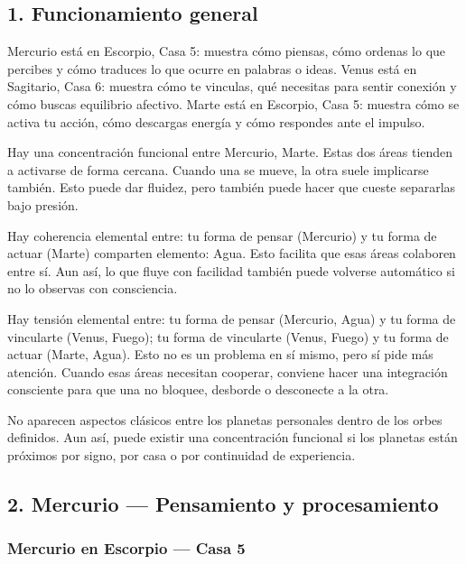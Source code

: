 \documentclass[11pt,a4paper]{article}
\begin{document}
\subsection{1. Funcionamiento general}

\justifying
Mercurio está en Escorpio, Casa 5: muestra cómo piensas, cómo ordenas lo que percibes y cómo traduces lo que ocurre en palabras o ideas.
Venus está en Sagitario, Casa 6: muestra cómo te vinculas, qué necesitas para sentir conexión y cómo buscas equilibrio afectivo.
Marte está en Escorpio, Casa 5: muestra cómo se activa tu acción, cómo descargas energía y cómo respondes ante el impulso.

Hay una concentración funcional entre Mercurio, Marte. Estas dos áreas tienden a activarse de forma cercana. Cuando una se mueve, la otra suele implicarse también. Esto puede dar fluidez, pero también puede hacer que cueste separarlas bajo presión.

Hay coherencia elemental entre: tu forma de pensar (Mercurio) y tu forma de actuar (Marte) comparten elemento: Agua. Esto facilita que esas áreas colaboren entre sí. Aun así, lo que fluye con facilidad también puede volverse automático si no lo observas con consciencia.

Hay tensión elemental entre: tu forma de pensar (Mercurio, Agua) y tu forma de vincularte (Venus, Fuego); tu forma de vincularte (Venus, Fuego) y tu forma de actuar (Marte, Agua). Esto no es un problema en sí mismo, pero sí pide más atención. Cuando esas áreas necesitan cooperar, conviene hacer una integración consciente para que una no bloquee, desborde o desconecte a la otra.

No aparecen aspectos clásicos entre los planetas personales dentro de los orbes definidos. Aun así, puede existir una concentración funcional si los planetas están próximos por signo, por casa o por continuidad de experiencia.

\vspace{0.8cm}

\subsection{2. Mercurio — Pensamiento y procesamiento}

\subsubsection*{Mercurio en Escorpio — Casa 5}
\end{document}
